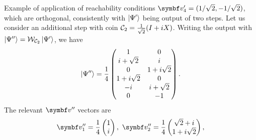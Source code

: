 \begin{examplebox}[label=ex:QWs:conditions_few_steps]{Example of application of reachability conditions}
    $\bs v'_4=(1/\sqrt2, -1/\sqrt2)$,
    which are orthogonal, consistently with $\ket{\Psi'}$ being output of two steps.
    Let us consider an additional step with coin ${\mathcal{C}}_2=\frac{1}{\sqrt2}(I + iX)$.
    Writing the output with $\ket{\Psi''}={\mathcal{W}}_{{\mathcal{C}}_2}\ket{\Psi'}$, we have
    \begin{equation}
        \ket{\Psi''} = \frac{1}{4}
        \begin{pmatrix}
            1 & 0 \\
            i + \sqrt2 & i \\
            0 & 1 + i\sqrt2 \\
            1 + i\sqrt2 & 0 \\
            -i & i + \sqrt2 \\
            0 & -1
        \end{pmatrix}.
    \end{equation}
    The relevant $\bs v''$ vectors are
    \begin{equation}
    \begin{aligned}
        \bs v''_1 = \frac{1}{4}\begin{pmatrix} 1 \\ i \end{pmatrix},
        \,\,
        \bs v''_2 = \frac{1}{4}\begin{pmatrix} \sqrt2 + i \\ 1 + i\sqrt2 \end{pmatrix},

\end{aligned}
\end{equation}
\end{examplebox}
